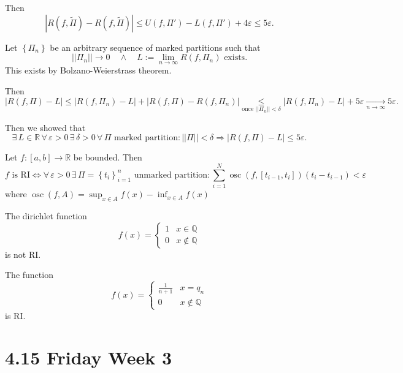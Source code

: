 \documentclass{notes}
\begin{document}
\begin{prf}
    Then 
    \[
      \left | R(f, \tilde \Pi) - R(f, \tilde \Pi) \right | \leq U(f, \Pi') - L(f, \Pi') + 4 \varepsilon \leq 5 \varepsilon.
    \]
    
    Let $\left \{ \Pi_n \right \}$ be an arbitrary sequence of marked partitions such that 
    \[
      ||\Pi_n|| \to 0 \quad \land \quad L := \lim_{n \to \infty} R(f, \Pi_n) \text{ exists}.
    \]
    This exists by Bolzano-Weierstrass theorem.
    
    Then 
    \[
      \left | R(f, \Pi) - L \right | \leq \left | R(f, \Pi_n) - L \right | + \left | R(f, \Pi) - R(f, \Pi_n) \right | \underset{\text{once } ||\Pi_n|| < \delta}{\leq} \left | R(f, \Pi_n) - L \right | + 5 \varepsilon \underset{n \to \infty}{\longrightarrow} 5 \varepsilon.
    \]
    
    Then we showed that 
    \[
      \exists \, L \in \mathbb R \, \forall \, \varepsilon > 0 \, \exists \, \delta > 0 \, \forall \, \Pi \text{ marked partition}: ||\Pi|| < \delta \Rightarrow \left | R(f, \Pi) - L \right | \leq 5 \varepsilon.
    \]
  \end{prf}
  
  \begin{cor}
    Let $f \colon [a, b] \to \mathbb R$ be bounded.
    Then 
    \[
      \text{$f$ is RI} \Leftrightarrow \forall \, \varepsilon > 0 \, \exists \, \Pi = \left \{ t_i \right \}_{i = 1}^n \text{ unmarked partition}: \sum_{i = 1}^N \operatorname{osc}(f, [t_{i - 1}, t_i])(t_i - t_{i - 1}) < \varepsilon
    \]
    where $\operatorname{osc}(f, A) = \sup_{x \in A} f(x) - \inf_{x \in A} f(x)$
  \end{cor}
  
  \begin{eg}
    The dirichlet function 
    \[
      f(x) = \begin{cases}
        1 & x \in \mathbb Q \\ 
        0 & x \not \in \mathbb Q
      \end{cases}
    \]
    is not RI.
  \end{eg}
  
  \begin{eg}
    The function 
    \[
      f(x) = \begin{cases}
        \frac{1}{n + 1} & x = q_n \\ 
        0 & x \not \in \mathbb Q
      \end{cases}
    \]
    is RI.
  \end{eg}
  
  \section{4.15 Friday Week 3}
  
\end{document}
